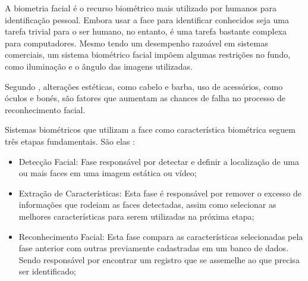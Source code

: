 A biometria facial é o recurso biométrico mais utilizado por humanos para identificação 
pessoal. Embora usar a face para identificar conhecidos seja uma tarefa trivial para 
o ser humano, no entanto, é uma tarefa bastante complexa para computadores. Mesmo 
tendo um desempenho razoável em sistemas comerciais, um sistema biométrico facial 
impõem algumas restrições no fundo, como iluminação e o ângulo das imagens utilizadas.

Segundo , alterações estéticas, como cabelo e barba, uso de
acessórios, como óculos e bonés, são fatores que aumentam as chances de falha no processo
de reconhecimento facial.

Sistemas biométricos que utilizam a face como característica biométrica seguem três
etapas fundamentais. São elas :

\begin{itemize}
    \item Detecção Facial: Fase responsável por detectar e definir a localização de uma ou mais
    faces em uma imagem estática ou vídeo;

    \item Extração de Características: Esta fase é responsável por remover o excesso de
    informações que rodeiam as faces detectadas, assim como selecionar as melhores
    características para serem utilizadas na próxima etapa;

    \item Reconhecimento Facial: Esta fase compara as características selecionadas pela fase
    anterior com outras previamente cadastradas em um banco de dados. Sendo
    responsável por encontrar um registro que se assemelhe ao que precisa ser
    identificado;

\end{itemize}
